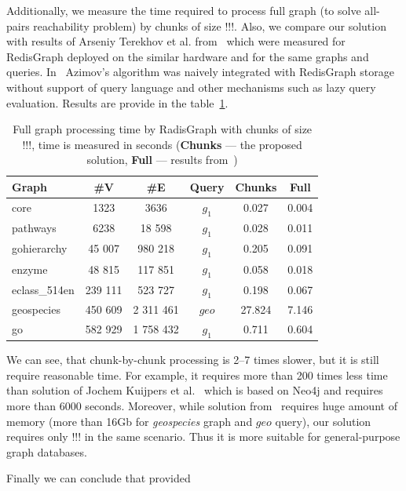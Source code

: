 Additionally, we measure the time required to process full graph (to solve all-pairs reachability problem) by chunks of size  !!!.
Also, we compare our solution with results of Arseniy Terekhov et al. from~\cite{10.1145/3398682.3399163} which were measured for RedisGraph deployed on the similar hardware and for the same graphs and queries. In~\cite{10.1145/3398682.3399163} Azimov's algorithm was naively integrated with RedisGraph storage without support of query language and other mechanisms such as lazy query evaluation.
Results are provide in the table~\ref{tbl:redis_full_graph_processing}.

\begin{table}
{
\caption{Full graph processing time by RadisGraph with chunks of size !!!, time is measured in seconds (\textbf{Chunks} --- the proposed solution, \textbf{Full} --- results from~\cite{10.1145/3398682.3399163})}
\label{tbl:redis_full_graph_processing}
\small
{}
\begin{tabular}{|l|c|c|c|c|c|}
\hline
Graph                       & \#V       & \#E      & Query  & Chunks  &  Full  \\
\hline
\hline
core                        & 1323     & 3636       & $g_1$  & 0.027  &  0.004 \\ 
pathways                    & 6238     & 18 598     & $g_1$  & 0.028  &  0.011 \\ 
gohierarchy                 & 45 007   & 980 218    & $g_1$  & 0.205  &  0.091 \\ 
enzyme                      & 48 815   & 117 851    & $g_1$  & 0.058  &  0.018 \\ 
eclass\_514en               & 239 111  & 523 727    & $g_1$  & 0.198  &  0.067 \\ 
geospecies                  & 450 609  & 2 311 461  & $geo$  & 27.824 &  7.146 \\
go                          & 582 929  & 1 758 432  & $g_1$  & 0.711  &  0.604 \\ 
\hline
\end{tabular}
}
\end{table}

We can see, that chunk-by-chunk processing is 2--7 times slower, but it is still require reasonable time.
For example, it requires more than 200 times less time than solution of Jochem Kuijpers et al.~\cite{Kuijpers:2019:ESC:3335783.3335791} which is based on Neo4j and requires more than 6000 seconds.
Moreover, while solution from~\cite{10.1145/3398682.3399163} requires huge amount of memory (more than 16Gb for \textit{geospecies} graph and $geo$ query), our solution requires only !!! in the same scenario.
Thus it is more suitable for general-purpose graph databases.

Finally we can conclude that provided 